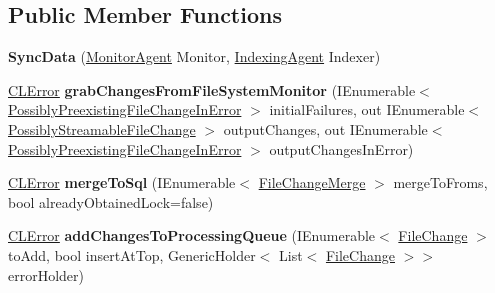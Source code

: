 \subsection*{Public Member Functions}
\begin{DoxyCompactItemize}
\item 
\hypertarget{class_file_monitor_1_1_sync_implementation_1_1_sync_data_a4e85541ec0be6b932e75639b65fc7624}{{\bfseries Sync\-Data} (\hyperlink{class_file_monitor_1_1_monitor_agent}{Monitor\-Agent} Monitor, \hyperlink{class_s_q_l_indexer_1_1_indexing_agent}{Indexing\-Agent} Indexer)}\label{class_file_monitor_1_1_sync_implementation_1_1_sync_data_a4e85541ec0be6b932e75639b65fc7624}

\item 
\hypertarget{class_file_monitor_1_1_sync_implementation_1_1_sync_data_a63f1816a70feca228eaf892cfe8d045d}{\hyperlink{class_cloud_api_public_1_1_model_1_1_c_l_error}{C\-L\-Error} {\bfseries grab\-Changes\-From\-File\-System\-Monitor} (I\-Enumerable$<$ \hyperlink{struct_cloud_api_public_1_1_model_1_1_possibly_preexisting_file_change_in_error}{Possibly\-Preexisting\-File\-Change\-In\-Error} $>$ initial\-Failures, out I\-Enumerable$<$ \hyperlink{struct_cloud_api_public_1_1_model_1_1_possibly_streamable_file_change}{Possibly\-Streamable\-File\-Change} $>$ output\-Changes, out I\-Enumerable$<$ \hyperlink{struct_cloud_api_public_1_1_model_1_1_possibly_preexisting_file_change_in_error}{Possibly\-Preexisting\-File\-Change\-In\-Error} $>$ output\-Changes\-In\-Error)}\label{class_file_monitor_1_1_sync_implementation_1_1_sync_data_a63f1816a70feca228eaf892cfe8d045d}

\item 
\hypertarget{class_file_monitor_1_1_sync_implementation_1_1_sync_data_afd32a324975ef81a72cfc39ed67179f7}{\hyperlink{class_cloud_api_public_1_1_model_1_1_c_l_error}{C\-L\-Error} {\bfseries merge\-To\-Sql} (I\-Enumerable$<$ \hyperlink{struct_cloud_api_public_1_1_model_1_1_file_change_merge}{File\-Change\-Merge} $>$ merge\-To\-Froms, bool already\-Obtained\-Lock=false)}\label{class_file_monitor_1_1_sync_implementation_1_1_sync_data_afd32a324975ef81a72cfc39ed67179f7}

\item 
\hypertarget{class_file_monitor_1_1_sync_implementation_1_1_sync_data_af8c85a281b15c55a5a046c85ef2a672c}{\hyperlink{class_cloud_api_public_1_1_model_1_1_c_l_error}{C\-L\-Error} {\bfseries add\-Changes\-To\-Processing\-Queue} (I\-Enumerable$<$ \hyperlink{class_cloud_api_public_1_1_model_1_1_file_change}{File\-Change} $>$ to\-Add, bool insert\-At\-Top, Generic\-Holder$<$ List$<$ \hyperlink{class_cloud_api_public_1_1_model_1_1_file_change}{File\-Change} $>$$>$ error\-Holder)}\label{class_file_monitor_1_1_sync_implementation_1_1_sync_data_af8c85a281b15c55a5a046c85ef2a672c}


\end{DoxyCompactItemize}
